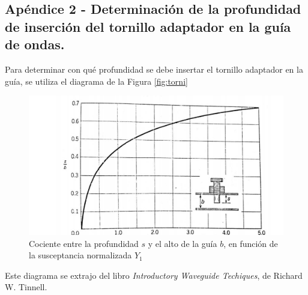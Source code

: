\documentclass[11pt,a4paper]{article}
\begin{document}
\begin{appendices}
\section{Apéndice 2 - Determinación de la profundidad de inserción del tornillo adaptador en la guía de ondas.}
Para determinar con qué profundidad se debe insertar el tornillo adaptador en la guía, se utiliza el diagrama de la 
Figura \ref{fig:torni} 
\begin{figure}[H]
    \centering
    \includegraphics[scale=0.5]{Images/Apendice 2.jpg}
    \caption{Cociente entre la profundidad $s$ y el alto de la guía $b$, en función de la susceptancia normalizada $Y_1$}
\end{figure}\label{fig:torni}
Este diagrama se extrajo del libro \textit{Introductory Waveguide Techiques}, de Richard W. Tinnell.


\end{appendices}


\begin{multicols}{2}
    

\end{multicols}
\end{document}
